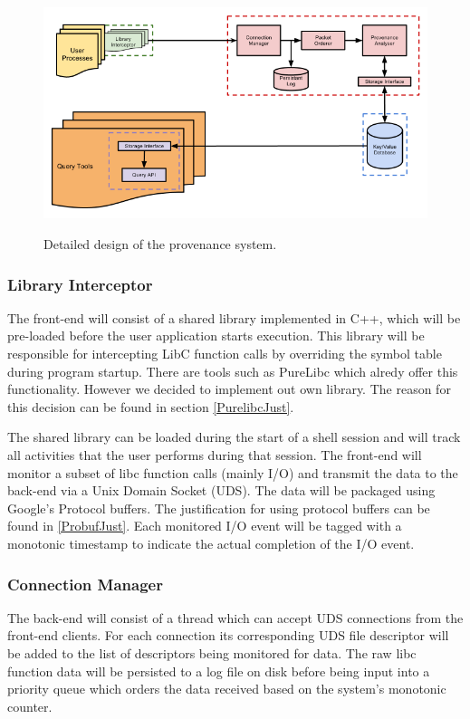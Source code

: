 \begin{figure}
\includegraphics[width=\textwidth]{res/ProvDesign.png}
\label{fig:detdes}
\caption{Detailed design of the provenance system.}
\end{figure}

\subsubsection{Library Interceptor}
The front-end will consist of a shared library implemented in C++, which will be pre-loaded before the user application starts execution. This library will be responsible for intercepting LibC function calls by overriding the symbol table during program startup. There are tools such as PureLibc which alredy offer this functionality. However we decided to implement out own library. The reason for this decision can be found in section \ref{PurelibcJust}.

The shared library can be loaded during the start of a shell session and will track all activities that the user performs during that session. The front-end will monitor a subset of libc function calls (mainly I/O) and transmit the data to the back-end via a Unix Domain Socket (UDS). The data will be packaged using Google's Protocol buffers. The justification for using protocol buffers can be found in \ref{ProbufJust}. Each monitored I/O event will be tagged with a monotonic timestamp to indicate the actual completion of the I/O event.

\subsubsection{Connection Manager}
The back-end will consist of a thread which can accept UDS connections from the front-end clients. For each connection its corresponding UDS file descriptor will be added to the list of descriptors being monitored for data. The raw libc function data will be persisted to a log file on disk before being input into a priority queue which orders the data received based on the system's monotonic counter.

